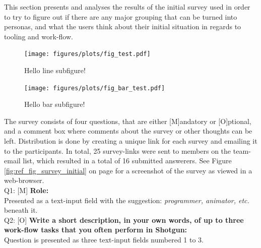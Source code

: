   This section presents and analyses the results of the initial survey used in
  order to try to figure out if there are any major grouping that can be turned
  into personas, and what the users think about their initial situation in
  regards to tooling and work-flow.

  \begin{minipage}[b]{0.44\textwidth}
    \begin{figure}[H]
      \centering
        \texttt{[image: figures/plots/fig\_test.pdf]}
        \caption{Hello line subfigure!}
      \end{figure}
  \end{minipage}
  \begin{minipage}[b]{0.49\textwidth}
    \begin{figure}[H]
      \texttt{[image: figures/plots/fig\_bar\_test.pdf]}
      \caption{Hello bar subfigure!}
    \end{figure}
  \end{minipage}


  \vspace{0.2cm}
  The survey consists of four questions, that are either [M]andatory or
  [O]ptional, and a comment box where comments about the survey or other
  thoughts can be left. Distribution is done by creating a unique link for each
  survey and emailing it to the participants. In total, 25 survey-links were
  sent to members on the team-email list, which resulted in a total of 16
  submitted answerers. See Figure \ref{fig:ref_fig_survey_initial} on page
  \pageref{fig:ref_fig_survey_initial} for a screenshot of
  the survey as viewed in a web-browser.\\

  Q1: [M] \textbf{Role:} \\
  Presented as a text-input field with the suggestion: \textit{programmer,
    animator, etc.} beneath it. \\

  Q2: [O] \textbf{%
    Write a short description, in your own words, of up to three
    work-flow tasks that you often perform in Shotgun:
  } \\
  Question is presented as three text-input fields numbered 1 to 3.\\

